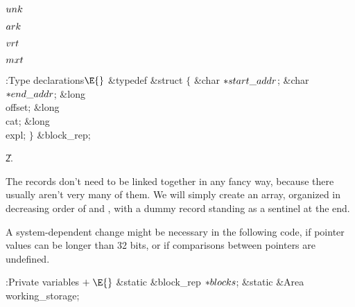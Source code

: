 \Y\B\4\D$\\{unk}$ \5
\par
\B\4\D$\\{ark}$ \5
%
\par
\B\4\D$\\{vrt}$ \5
\par
\B\4\D$\\{mxt}$ \5
%
\par
\Y\B\4:Type declarations\X${}\E{}$\6
\&{typedef} \&{struct} ${}\{{}$\1\6
\&{char} ${}{*}\\{start\_addr}{}$;\6
\&{char} ${}{*}\\{end\_addr}{}$;\6
\&{long} \\{offset};\6
\&{long} \\{cat};\6
\&{long} \\{expl};\2\6
${}\}{}$ \&{block\_rep};\par
\U2.\fi

The  records don't need to be linked together in any
fancy way,
because there usually aren't very many of them. We will simply create
an array, organized in decreasing order of  and , with a
dummy record standing as a sentinel at the end.

A system-dependent change might be necessary in the following code,
if pointer values can be longer than 32 bits, or if comparisons between
pointers are undefined.

\Y\B\4:Private variables\X${}\mathrel+\E{}$\6
\&{static} \&{block\_rep} ${}{*}\\{blocks}{}$;\6
\&{static} \&{Area} \\{working\_storage};\par
\fi

